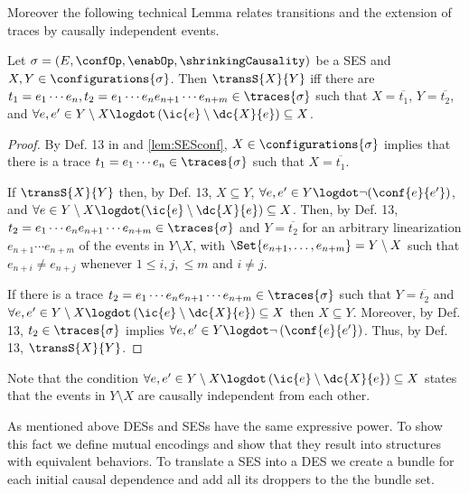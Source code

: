 \documentclass[runningheads,a4paper]{llncs}
\begin{document}
Moreover the following technical Lemma relates transitions and the extension of traces by causally independent events.

\begin{lemma}
	\label{lem:SEStransTraces}
	Let $ \sigma = \left( E, \confOp, \enabOp, \shrinkingCausality \right) $ be a SES and $ X, Y \in \configurations{\sigma} $.	Then $ \transS{X}{Y} $ iff there are $ t_1 = e_1 \cdots e_n, t_2 = e_1 \cdots e_n e_{n + 1} \cdots e_{n + m} \in \traces{\sigma} $ such that $ X = \overline{t_1} $, $ Y = \overline{t_2} $, and $ \forall e, e' \in Y \setminus X \logdot \left( \ic{e} \setminus \dc{X}{e} \right) \subseteq X $.
\end{lemma}

\begin{proof}
	By Def. 13 in \cite{dynamicCausality15} and \lem\ref{lem:SESconf}, $ X \in \configurations{\sigma} $ implies that there is a trace $ t_1 = e_1 \cdots e_n \in \traces{\sigma} $ such that $ X = \overline{t_1} $.

	If $ \transS{X}{Y} $ then, by Def. 13, $ X \subseteq Y $, $ \forall e, e' \in Y \logdot \neg ( \conf{e}{e'} ) $, and $ \forall e \in Y \setminus X \logdot ( \ic{e} \setminus \dc{X}{e} ) \subseteq X $. Then, by Def. 13, $ t_2 = e_1 \cdots e_n e_{n + 1} \cdots e_{n + m} \in \traces{\sigma} $ and $ Y = \overline{t_2} $ for an arbitrary linearization $ e_{n + 1} \cdots e_{n + m} $ of the events in $ Y \setminus X $, \ie with $ \Set{ e_{n + 1}, \ldots, e_{n + m} } = Y \setminus X $ such that $ e_{n + i} \neq e_{n + j} $ whenever $ 1 \leq i, j, \leq m $ and $ i \neq j $.
	
	If there is a trace $ t_2 = e_1 \cdots e_n e_{n + 1} \cdots e_{n + m} \in \traces{\sigma} $ such that $ Y = \overline{t_2} $ and $ \forall e, e' \in Y \setminus X \logdot \left( \ic{e} \setminus \dc{X}{e} \right) \subseteq X $ then $ X \subseteq Y $. Moreover, by Def. 13, $ t_2 \in \traces{\sigma} $ implies $ \forall e, e' \in Y \logdot \neg \left( \conf{e}{e'} \right) $. Thus, by Def. 13, $ \transS{X}{Y} $.
\end{proof}

Note that the condition $ \forall e, e' \in Y \setminus X \logdot \left( \ic{e}
\setminus \dc{X}{e} \right) \subseteq X $ states that the events in $ Y
\setminus X $ are causally independent from each other.

As mentioned above DESs and SESs have the same expressive power. To show this fact we define mutual encodings and show that they result into structures with equivalent behaviors. To translate a SES into a DES we create a bundle for each initial causal dependence and add all its droppers to the the bundle set.
\end{document}
